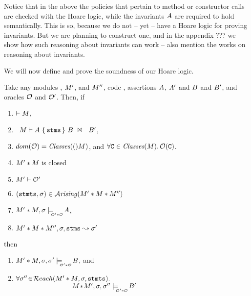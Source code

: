 Notice that in the above the policies that pertain to method or constructor calls are checked with the Hoare logic, while the invariants
$A$ are required to hold semantically. This is so, because we do not -- yet -- have a Hoare logic for proving invariants. But we are planning to construct one, and in the  appendix ??? we show how such reasoning about invariants can work -- also mention the works on reasoning about invariants.
\vspace{.1in}

We will now define and prove the soundness of our Hoare logic.




\begin{theorem}
\label{lemma:hl:soundness}
Take any modules  \M , $M'$, and $M''$,  code , assertions $A$, $A'$ and $B$ and $B'$, and  oracles
${\cal O}$ and ${\cal O}'$. Then, if
\begin{enumerate}
\item
 $\vdash M$, 
 \item
\ ${{M}\vdash {\ensuremath {A}}\ \{\, {{\textrm{\ttfamily{stms}}}}\, \}\ {B}\ \Join\ \ {B'} }$,   
 \item
 $dom({\cal O})={\textrm{{\it {Classes}}}}({(})M)$,  and $\forall {\ensuremath{\textrm{\ttfamily{C}}}}\in{\textrm{{\it {Classes}}}}({M}).\, {\cal O}({\textrm{\ttfamily{C}}})$.
 \item
 $M'*M$ is closed
 \item
 $M'\vdash {\ensuremath{\cal O}}'$
\item
{$({\textrm{\ttfamily{stmts}}},\sigma)\in {\mathcal{A}}\textrm{\textit{rising}}(M'*M*M'')$}
\item
{$\M' * \M, \sigma \modelsWith{\O'*\O}   \A$},
 \item
{$M'*M*M'', \sigma, {\textrm{\ttfamily{stms}}} \leadsto \sigma'$}
\end{enumerate}
then
\begin{enumerate}
\item
$\M' *\M, \sigma, \sigma' \modelsWith{\O'*\O}    \B$,  and
\item
$\forall {\sigma''}\!\in\!{\mathcal{R}each}(M' *M,\sigma,{{\textrm{\ttfamily{stmts}}}}).$\\ 
$ ~ \hspace{1in} \ \ \M\!*\!\M', \sigma, {\sigma''} \modelsWith{\O'*\O}    \B'   $
\end{enumerate}
\end{theorem}


